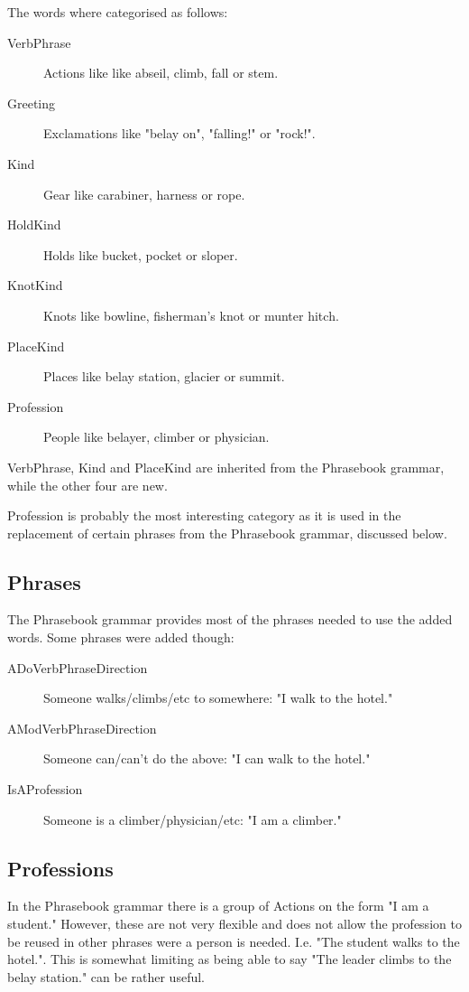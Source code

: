The words where categorised as follows:
\begin{description}
\item[VerbPhrase] Actions like like abseil, climb, fall or stem.
\item[Greeting] Exclamations like "belay on", "falling!" or "rock!".
\item[Kind] Gear like carabiner, harness or rope.
\item[HoldKind] Holds like bucket, pocket or sloper.
\item[KnotKind] Knots like bowline, fisherman's knot or munter hitch.
\item[PlaceKind] Places like belay station, glacier or summit.
\item[Profession] People like belayer, climber or physician.
\end{description}
VerbPhrase, Kind and PlaceKind are inherited from the Phrasebook grammar, while the other four are new.

Profession is probably the most interesting category as it is used in the replacement of certain phrases from the Phrasebook grammar, discussed below.

\subsection{Phrases}
The Phrasebook grammar provides most of the phrases needed to use the added words. Some phrases were added though:
\begin{description}
\item[ADoVerbPhraseDirection] Someone walks/climbs/etc to somewhere: "I walk to the hotel."
\item[AModVerbPhraseDirection] Someone can/can't do the above: "I can walk to the hotel."
\item[IsAProfession] Someone is a climber/physician/etc: "I am a climber."
\end{description}

\subsection{Professions}
In the Phrasebook grammar there is a group of Actions on the form "I am a student." However, these are not very flexible and does not allow the profession to be reused in other phrases were a person is needed. I.e. "The student walks to the hotel.".
This is somewhat limiting as being able to say "The leader climbs to the belay station." can be rather useful.

